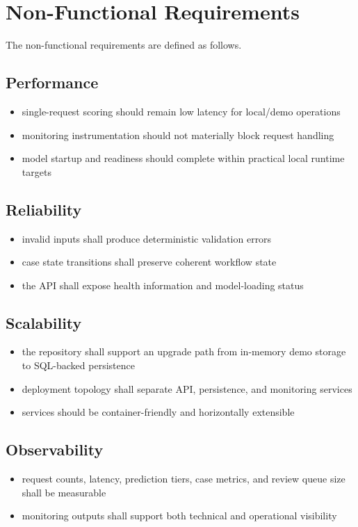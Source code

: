 \documentclass[11pt]{article}
\begin{document}
\section{Non-Functional Requirements}
The non-functional requirements are defined as follows.

\subsection*{Performance}
\begin{itemize}
  \item single-request scoring should remain low latency for local/demo operations
  \item monitoring instrumentation should not materially block request handling
  \item model startup and readiness should complete within practical local runtime targets
\end{itemize}

\subsection*{Reliability}
\begin{itemize}
  \item invalid inputs shall produce deterministic validation errors
  \item case state transitions shall preserve coherent workflow state
  \item the API shall expose health information and model-loading status
\end{itemize}

\subsection*{Scalability}
\begin{itemize}
  \item the repository shall support an upgrade path from in-memory demo storage to SQL-backed persistence
  \item deployment topology shall separate API, persistence, and monitoring services
  \item services should be container-friendly and horizontally extensible
\end{itemize}

\subsection*{Observability}
\begin{itemize}
  \item request counts, latency, prediction tiers, case metrics, and review queue size shall be measurable
  \item monitoring outputs shall support both technical and operational visibility
\end{itemize}
\end{document}
